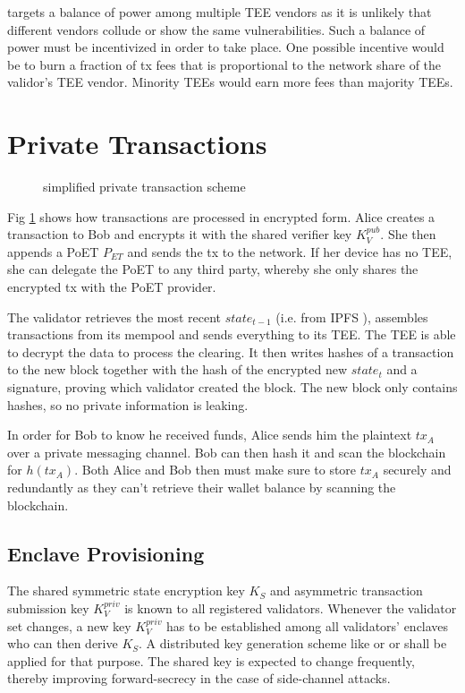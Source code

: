 \documentclass[conference]{IEEEtran}
\begin{document}
\encointer targets a balance of power among multiple TEE vendors as it is unlikely that different vendors collude or show the same vulnerabilities. Such a balance of power must be incentivized in order to take place. One possible incentive would be to burn a fraction of tx fees that is proportional to the network share of the validor's TEE vendor. Minority TEEs would earn more fees than majority TEEs.

\section{Private Transactions}\label{sec:privtx}
\begin{figure}
	\centering
	\def\svgwidth{\columnwidth}
	
	\caption{simplified private transaction scheme}
	\label{fig:blockgen}
\end{figure}
Fig \ref{fig:blockgen} shows how transactions are processed in encrypted form. Alice creates a transaction to Bob and encrypts it with the shared verifier key $K_V^{pub}$. She then appends a PoET $P_{ET}$ and sends the tx to the network. If her device has no TEE, she can delegate the PoET to any third party, whereby she only shares the encrypted tx with the PoET provider.

The validator retrieves the most recent $state_{t-1}$ (i.e. from IPFS \cite{ipfs}), assembles transactions from its mempool and sends everything to its TEE. The TEE is able to decrypt the data to process the clearing. It then writes hashes of a transaction to the new block together with the hash of the encrypted new $state_t$ and a signature, proving which validator created the block.
The new block only contains hashes, so no private information is leaking.

In order for Bob to know he received funds, Alice sends him the plaintext $tx_A$ over a private messaging channel. Bob can then hash it and scan the blockchain for $h(tx_A)$. Both Alice and Bob then must make sure to store $tx_A$ securely and redundantly as they can't retrieve their wallet balance by scanning the blockchain. 

\subsection{Enclave Provisioning}
The shared symmetric state encryption key $K_S$ and asymmetric transaction submission key $K_V^{priv}$ is known to all registered validators. Whenever the validator set changes, a new key $K_V^{priv}$ has to be established among all validators' enclaves who can then derive $K_S$. A distributed key generation scheme like \cite{gennaro1999} or \cite{tseng2005} or shall be applied for that purpose.
The shared key is expected to change frequently, thereby improving forward-secrecy in the case of side-channel attacks.
\end{document}
